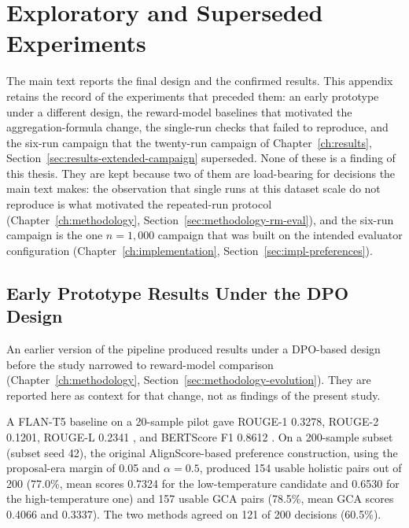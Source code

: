 \chapter{Exploratory and Superseded Experiments}
\label{app:exploratory}

The main text reports the final design and the confirmed results. This appendix
retains the record of the experiments that preceded them: an early prototype
under a different design, the reward-model baselines that motivated the
aggregation-formula change, the single-run checks that failed to reproduce, and
the six-run campaign that the twenty-run campaign of
Chapter~\ref{ch:results}, Section~\ref{sec:results-extended-campaign}
superseded. None of these is a finding of this thesis. They are kept because
two of them are load-bearing for decisions the main text makes: the
observation that single runs at this dataset scale do not reproduce is what
motivated the repeated-run protocol
(Chapter~\ref{ch:methodology}, Section~\ref{sec:methodology-rm-eval}), and the
six-run campaign is the one $n=1{,}000$ campaign that was built on the
intended evaluator configuration
(Chapter~\ref{ch:implementation}, Section~\ref{sec:impl-preferences}).

\section{Early Prototype Results Under the DPO Design}
\label{sec:results-early}

An earlier version of the pipeline produced results under a DPO-based design
before the study narrowed to reward-model comparison
(Chapter~\ref{ch:methodology}, Section~\ref{sec:methodology-evolution}). They
are reported here as context for that change, not as findings of the present
study.

A FLAN-T5 \citep{chung2022flant5} baseline on a 20-sample pilot gave
ROUGE-1 0.3278, ROUGE-2 0.1201, ROUGE-L 0.2341 \citep{lin2004rouge}, and
BERTScore F1 0.8612 \citep{zhang2020bertscore}. On a
200-sample subset (subset seed 42), the original AlignScore-based preference
construction, using the proposal-era margin of 0.05 and $\alpha = 0.5$, produced 154
usable holistic pairs out of 200 (77.0\%, mean scores 0.7324 for the low-temperature
candidate and 0.6530 for the high-temperature one) and 157 usable GCA pairs
(78.5\%, mean GCA scores 0.4066 and 0.3337). The two methods agreed on 121 of 200
decisions (60.5\%).

